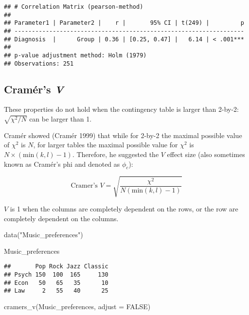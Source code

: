 \documentclass[
]{article}
\newenvironment{Shaded}{\begin{snugshade}}{\end{snugshade}}
\newcommand{\AttributeTok}[1]{\textcolor[rgb]{0.77,0.63,0.00}{#1}}
\newcommand{\ConstantTok}[1]{\textcolor[rgb]{0.00,0.00,0.00}{#1}}
\newcommand{\FunctionTok}[1]{\textcolor[rgb]{0.00,0.00,0.00}{#1}}
\newcommand{\NormalTok}[1]{#1}
\newcommand{\StringTok}[1]{\textcolor[rgb]{0.31,0.60,0.02}{#1}}
\begin{document}
\begin{verbatim}
## # Correlation Matrix (pearson-method)
## 
## Parameter1 | Parameter2 |    r |       95% CI | t(249) |         p
## ------------------------------------------------------------------
## Diagnosis  |      Group | 0.36 | [0.25, 0.47] |   6.14 | < .001***
## 
## p-value adjustment method: Holm (1979)
## Observations: 251
\end{verbatim}

\hypertarget{cramuxe9rs-v}{%
\subsection{\texorpdfstring{Cramér's
\emph{V}}{Cramér's V}}\label{cramuxe9rs-v}}

These properties do not hold when the contingency table is larger than
2-by-2: \(\sqrt{\chi^2/N}\) can be larger than 1.

Cramér showed (Cramér 1999) that while for 2-by-2 the maximal possible
value of \(\chi^2\) is \(N\), for larger tables the maximal possible
value for \(\chi^2\) is \(N\times (\text{min}(k,l)-1)\). Therefore, he
suggested the \(V\) effect size (also sometimes known as Cramér's phi
and denoted as \(\phi_{c}\)):

\[
\text{Cramer's } V = \sqrt{\frac{\chi^2}{N(\text{min}(k,l)-1)}}
\]

\(V\) is 1 when the columns are completely dependent on the rows, or the
row are completely dependent on the columns.

\begin{Shaded}
\begin{Highlighting}[]
\FunctionTok{data}\NormalTok{(}\StringTok{"Music\_preferences"}\NormalTok{)}

\NormalTok{Music\_preferences}
\end{Highlighting}
\end{Shaded}

\begin{verbatim}
##       Pop Rock Jazz Classic
## Psych 150  100  165     130
## Econ   50   65   35      10
## Law     2   55   40      25
\end{verbatim}

\begin{Shaded}
\begin{Highlighting}[]
\FunctionTok{cramers\_v}\NormalTok{(Music\_preferences, }\AttributeTok{adjust =} \ConstantTok{FALSE}\NormalTok{)}
\end{Highlighting}
\end{Shaded}
\end{document}
